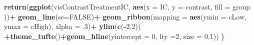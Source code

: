 \documentclass[10pt,dvipsnames,enabledeprecatedfontcommands]{scrartcl}
\newenvironment{Shaded}{\begin{snugshade}}{\end{snugshade}}
\newcommand{\KeywordTok}[1]{\textcolor[rgb]{0.13,0.29,0.53}{\textbf{#1}}}
\newcommand{\DataTypeTok}[1]{\textcolor[rgb]{0.13,0.29,0.53}{#1}}
\newcommand{\DecValTok}[1]{\textcolor[rgb]{0.00,0.00,0.81}{#1}}
\newcommand{\FloatTok}[1]{\textcolor[rgb]{0.00,0.00,0.81}{#1}}
\newcommand{\StringTok}[1]{\textcolor[rgb]{0.31,0.60,0.02}{#1}}
\newcommand{\OtherTok}[1]{\textcolor[rgb]{0.56,0.35,0.01}{#1}}
\newcommand{\OperatorTok}[1]{\textcolor[rgb]{0.81,0.36,0.00}{\textbf{#1}}}
\newcommand{\NormalTok}[1]{#1}
\begin{document}
\begin{Shaded}
\begin{Highlighting}[]
  \KeywordTok{return}\NormalTok{(}\KeywordTok{ggplot}\NormalTok{(visContrastTreatmentIC, }\KeywordTok{aes}\NormalTok{(}\DataTypeTok{x =}\NormalTok{ IC, }\DataTypeTok{y =}\NormalTok{ contrast, }\DataTypeTok{fill =}\NormalTok{ group ))}\OperatorTok{+}
\StringTok{           }\KeywordTok{geom_line}\NormalTok{(}\DataTypeTok{se=}\OtherTok{FALSE}\NormalTok{)}\OperatorTok{+}
\StringTok{    }\KeywordTok{geom_ribbon}\NormalTok{(}\DataTypeTok{mapping =} \KeywordTok{aes}\NormalTok{(}\DataTypeTok{ymin =}\NormalTok{ cLow, }\DataTypeTok{ymax =}\NormalTok{ cHigh), }\DataTypeTok{alpha =} \FloatTok{.3}\NormalTok{)}\OperatorTok{+}
\StringTok{    }\KeywordTok{ylim}\NormalTok{(}\KeywordTok{c}\NormalTok{(}\OperatorTok{-}\DecValTok{2}\NormalTok{,}\DecValTok{2}\NormalTok{)) }\OperatorTok{+}\KeywordTok{theme_tufte}\NormalTok{()}\OperatorTok{+}\KeywordTok{geom_hline}\NormalTok{(}\DataTypeTok{yintercept =} \DecValTok{0}\NormalTok{, }\DataTypeTok{lty =}\DecValTok{2}\NormalTok{, }\DataTypeTok{size =} \FloatTok{0.1}\NormalTok{))}
\NormalTok{\}}



\end{Highlighting}
\end{Shaded}
\end{document}
